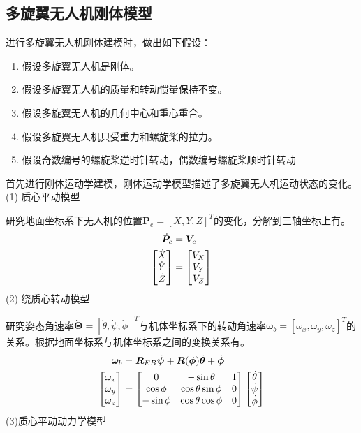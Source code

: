 \subsection{多旋翼无人机刚体模型}
进行多旋翼无人机刚体建模时，做出如下假设\upcite{[2.3]}：
\begin{enumerate}  [itemindent=1em,label={(\arabic*)}]
\item 假设多旋翼无人机是刚体。
\item 假设多旋翼无人机的质量和转动惯量保持不变。
\item 假设多旋翼无人机的几何中心和重心重合。
\item 假设多旋翼无人机只受重力和螺旋桨的拉力。
\item 假设奇数编号的螺旋桨逆时针转动，偶数编号螺旋桨顺时针转动
\end{enumerate}
首先进行刚体运动学建模，刚体运动学模型描述了多旋翼无人机运动状态的变化。\\
(1) 质心平动模型

研究地面坐标系下无人机的位置$\boldsymbol{P}_e = [X,Y,Z]^T$的变化，分解到三轴坐标上有。
\begin{equation}
\label{equ2.2}
\begin{aligned}
\dot{\boldsymbol{P}}_e &= \boldsymbol{V}_e \\
\begin{bmatrix}
\dot{X} \cr \dot{Y} \cr \dot{Z} \cr
\end{bmatrix}
&=
\begin{bmatrix}
V_X \cr V_Y \cr V_Z \cr
\end{bmatrix}
\end{aligned}
\end{equation}
(2) 绕质心转动模型

研究姿态角速率$\dot{\boldsymbol{\Theta}}=[\dot{\theta},\dot{\psi},\dot{\phi}]^T$与机体坐标系下的转动角速率$\boldsymbol{\omega}_b=[\omega_x , \omega_y , \omega_z]^T$的关系。根据地面坐标系与机体坐标系之间的变换关系有。
\begin{equation}
\label{equ2.3}
\begin{aligned}
\boldsymbol{\omega}_b & = \boldsymbol{R}_{EB} \dot{\boldsymbol{\psi}}+\boldsymbol{R}(\boldsymbol{\phi}) \dot{\boldsymbol{\theta}}+ \dot{\boldsymbol{\phi}} 
\\
\begin{bmatrix}
\omega_x \cr \omega_y \cr \omega_z \cr
\end{bmatrix}
& =
\begin{bmatrix}
0 & -\sin \theta & 1 \cr
\cos \phi & \cos \theta \sin \phi & 0 \cr
-\sin \phi & \cos \theta \cos \phi & 0 \cr
\end{bmatrix}
\begin{bmatrix}
\dot{\theta} \cr \dot{\psi}  \cr  \dot{\phi} \cr
\end{bmatrix}
\end{aligned}
\end{equation}
(3)质心平动动力学模型

